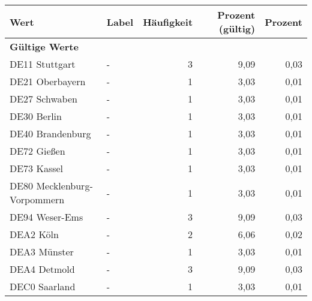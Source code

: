      \begin{longtable}{Xlrrr}
     \toprule
     \textbf{Wert} & \textbf{Label} & \textbf{Häufigkeit} & \textbf{Prozent (gültig)} & \textbf{Prozent} \\
     \endhead
     \midrule
     \multicolumn{5}{l}{\textbf{Gültige Werte}}\\

     \multicolumn{1}{X}{DE11 Stuttgart} &
     - &
     3 &
     9,09 &
     0,03 \\

     \multicolumn{1}{X}{DE21 Oberbayern} &
     - &
     1 &
     3,03 &
     0,01 \\

     \multicolumn{1}{X}{DE27 Schwaben} &
     - &
     1 &
     3,03 &
     0,01 \\

     \multicolumn{1}{X}{DE30 Berlin} &
     - &
     1 &
     3,03 &
     0,01 \\

     \multicolumn{1}{X}{DE40 Brandenburg} &
     - &
     1 &
     3,03 &
     0,01 \\

     \multicolumn{1}{X}{DE72 Gießen} &
     - &
     1 &
     3,03 &
     0,01 \\

     \multicolumn{1}{X}{DE73 Kassel} &
     - &
     1 &
     3,03 &
     0,01 \\

     \multicolumn{1}{X}{DE80 Mecklenburg-Vorpommern} &
     - &
     1 &
     3,03 &
     0,01 \\

     \multicolumn{1}{X}{DE94 Weser-Ems} &
     - &
     3 &
     9,09 &
     0,03 \\

     \multicolumn{1}{X}{DEA2 Köln} &
     - &
     2 &
     6,06 &
     0,02 \\

     \multicolumn{1}{X}{DEA3 Münster} &
     - &
     1 &
     3,03 &
     0,01 \\

     \multicolumn{1}{X}{DEA4 Detmold} &
     - &
     3 &
     9,09 &
     0,03 \\

     \multicolumn{1}{X}{DEC0 Saarland} &
     - &
     1 &
     3,03 &
     0,01 \\


\end{longtable}

